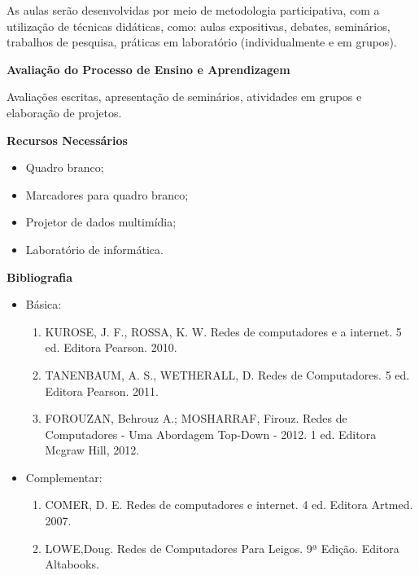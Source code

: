 \noindent
   As aulas serão desenvolvidas por meio de metodologia participativa, com a utilização de técnicas didáticas, como: aulas expositivas, debates, seminários, trabalhos de pesquisa, práticas em laboratório (individualmente e em grupos).

\begin{snugshade}\begin{center}\textbf{
    Avaliação do Processo de Ensino e Aprendizagem
}\end{center}\end{snugshade}

\noindent
  Avaliações escritas, apresentação de seminários, atividades em grupos e elaboração de projetos.
   
\begin{snugshade}\begin{center}\textbf{
    Recursos Necessários
    \vphantom{q} %
}\end{center}\end{snugshade}

\begin{itemize} 
	\item Quadro branco;
	\item Marcadores para quadro branco;
	\item Projetor de dados multimídia;
	\item Laboratório de informática.
\end{itemize}


\begin{snugshade}\begin{center}\textbf{
    Bibliografia
}\end{center}\end{snugshade}

\begin{itemize} 
  \item Básica:
	\begin{enumerate}
	\item KUROSE, J. F., ROSSA, K. W. Redes de computadores e a internet. 5 ed. Editora Pearson. 2010.
	\item TANENBAUM, A. S., WETHERALL, D. Redes de Computadores. 5 ed. Editora Pearson. 2011. 
	\item FOROUZAN, Behrouz A.; MOSHARRAF, Firouz. Redes de Computadores - Uma Abordagem Top-Down - 2012. 1 ed. Editora Mcgraw Hill, 2012.	
	\end{enumerate}
  \item Complementar:
	\begin{enumerate} 
	\item COMER, D. E. Redes de computadores e internet. 4 ed. Editora Artmed. 2007.
	\item LOWE,Doug. Redes de Computadores Para Leigos. 9ª Edição. Editora Altabooks.
	\end{enumerate}
\end{itemize}
